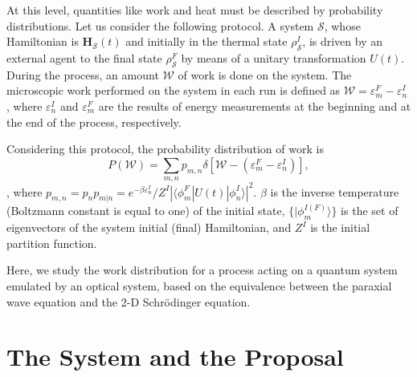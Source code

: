 \documentclass[a0,portrait]{a0poster}
\begin{document}
\begin{multicols}{2}
At this level, quantities like work and heat must be described by probability distributions. Let us consider the following protocol. A system $\mathcal{S}$, whose Hamiltonian is $\mathbf{H}_{\mathcal{S}}(t)$ and initially in the thermal state $\rho^{I}_{\mathcal{S}}$, is driven by an external agent to the final state $\rho^{F}_{\mathcal{S}}$ by means of a unitary transformation $U(t)$. During the process, an amount $\mathcal{W}$ of work is done on the system. The microscopic work performed on the system in each run is defined as $\mathcal{W} = \varepsilon^{F}_{m} - \varepsilon^{I}_{n}$ \cite{PRX_Jarzynski}, where $\varepsilon^{I}_{n}$ and $\varepsilon^{F}_{m}$ are the results of energy measurements at the beginning and at the end of the process, respectively. 

Considering this protocol, the probability distribution of work is
\begin{equation}
P\left(\mathcal{W}\right) = \sum_{m,n}p_{m,n}\delta\left[\mathcal{W} - \left(\varepsilon_{m}^{F} - \varepsilon_{n}^{I}\right)\right],
\label{eq:work}
\end{equation},
where $p_{m,n} = p_{n}p_{m|n} = e^{-\beta \varepsilon^{I}_{n}}/Z^{I}|\langle \phi^{F}_{m}| U(t) |\phi^{I}_{n}\rangle|^{2}$. $\beta$ is the inverse temperature (Boltzmann constant is equal to one) of the initial state, $\lbrace\vert\phi^{I(F)}_{m}\rangle\rbrace$ is the set of eigenvectors of the system initial (final) Hamiltonian, and $Z^{I}$ is the initial partition function. 

Here, we study the work distribution for a process acting on a quantum system emulated by an optical system, based on the equivalence between the paraxial wave equation and the 2-D Schr\"{o}dinger equation. 

\section*{The System and the Proposal}


\end{multicols}
\end{document}
